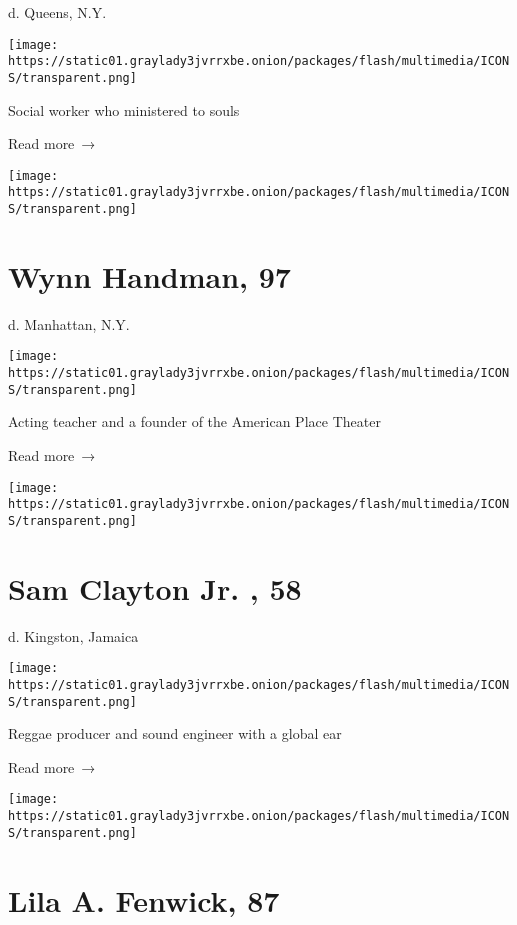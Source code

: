 d. Queens, N.Y.

\texttt{[image: https://static01.graylady3jvrrxbe.onion/packages/flash/multimedia/ICONS/transparent.png]}

Social worker who ministered to souls

 Read more~→

\href{https://www.nytimes3xbfgragh.onion/2020/04/14/theater/wynn-handman-dead-coronavirus.html}{}

\texttt{[image: https://static01.graylady3jvrrxbe.onion/packages/flash/multimedia/ICONS/transparent.png]}

\hypertarget{wynn-handman-97}{%
\section{Wynn Handman, 97}\label{wynn-handman-97}}

d. Manhattan, N.Y.

\texttt{[image: https://static01.graylady3jvrrxbe.onion/packages/flash/multimedia/ICONS/transparent.png]}

Acting teacher and a founder of the American Place Theater

 Read more~→

\href{https://www.nytimes3xbfgragh.onion/2020/04/13/obituaries/sam-clayton-jr-dead.html}{}

\texttt{[image: https://static01.graylady3jvrrxbe.onion/packages/flash/multimedia/ICONS/transparent.png]}

\hypertarget{sam-clayton-jr--58}{%
\section{Sam Clayton Jr. , 58}\label{sam-clayton-jr--58}}

d. Kingston, Jamaica

\texttt{[image: https://static01.graylady3jvrrxbe.onion/packages/flash/multimedia/ICONS/transparent.png]}

Reggae producer and sound engineer with a global ear

 Read more~→

\href{https://www.nytimes3xbfgragh.onion/2020/04/13/obituaries/lila-fenwick-dead-coronavirus.html}{}

\texttt{[image: https://static01.graylady3jvrrxbe.onion/packages/flash/multimedia/ICONS/transparent.png]}

\hypertarget{lila-a-fenwick-87}{%
\section{Lila A. Fenwick, 87}\label{lila-a-fenwick-87}}

